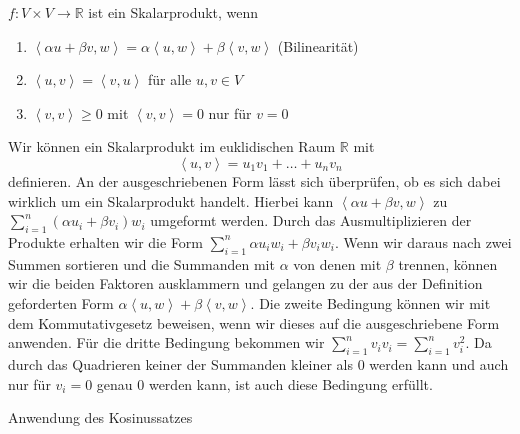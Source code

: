 \begin{Def}
$f:V\times V \rightarrow\mathbb{R}$ ist ein Skalarprodukt, wenn\\
\begin{enumerate}
\item $\left\langle  \alpha u + \beta v, w\right\rangle = \alpha \left\langle  u,w\right\rangle + \beta \left\langle  v,w\right\rangle $ (Bilinearität)
\item $\left\langle  u,v\right\rangle = \left\langle  v,u\right\rangle $ für alle $u,v \in V$
\item $\left\langle  v,v\right\rangle \geq 0$ mit $\left\langle  v,v\right\rangle = 0$ nur für $v = 0$
\end{enumerate}
\end{Def}
Wir können ein Skalarprodukt im euklidischen Raum $\mathbb{R}$ mit
\begin{equation}
\left\langle u,v\right\rangle  = u_1 v_1 + \dots + u_n v_n
\label{skal}
\end{equation}
definieren. An der ausgeschriebenen Form lässt sich überprüfen, ob es sich dabei wirklich um ein Skalarprodukt handelt. Hierbei kann  $\left\langle \alpha u + \beta v, w\right\rangle $ zu $\sum_{i=1}^n (\alpha u_i + \beta v_i)w_i$ umgeformt werden. Durch das Ausmultiplizieren der Produkte erhalten wir die Form $\sum_{i=1}^n \alpha u_i w_i + \beta v_i w_i$. Wenn wir daraus nach zwei Summen sortieren und die Summanden mit $\alpha$ von denen mit $\beta$ trennen, können wir die beiden Faktoren ausklammern und gelangen zu der aus der Definition geforderten Form $\alpha \left\langle u,w\right\rangle  + \beta \left\langle v,w\right\rangle $.
Die zweite Bedingung können wir mit dem Kommutativgesetz beweisen, wenn wir dieses auf die ausgeschriebene Form anwenden.
Für die dritte Bedingung bekommen wir $\sum_{i=1}^n v_i v_i = \sum_{i=1}^n v_i^2$. Da durch das Quadrieren keiner der Summanden kleiner als 0 werden kann und auch nur für $v_i = 0$ genau 0 werden kann, ist auch diese Bedingung erfüllt.

\begin{dsafigure}
\centering
{}
\caption {Anwendung des Kosinussatzes}
\label{Kosinussatz}
\end{dsafigure}

